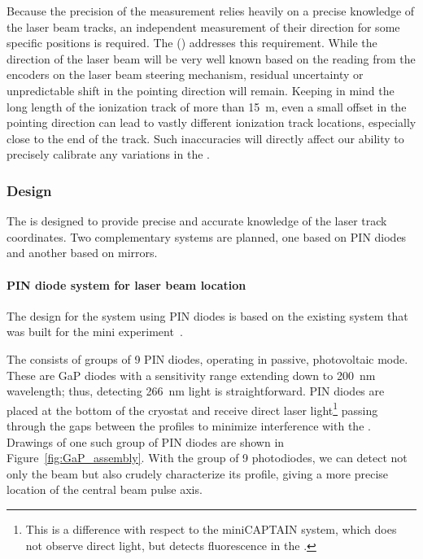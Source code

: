 \label{sec:calib-laser-pos}
Because the precision of the \efield measurement relies heavily on a precise knowledge of the laser beam tracks, an independent measurement of their direction for some specific positions is required. The %
 ()
addresses this requirement. While the direction of the laser beam will be very well known based on the reading from the encoders on the laser beam steering mechanism,  residual uncertainty or unpredictable shift in the pointing direction will remain. 
Keeping in mind the long length of the ionization track of more than \SI{15}{\m}, even a small offset in the pointing direction can lead to vastly different ionization track locations, especially close to the end of the track. Such inaccuracies will directly affect our ability to precisely calibrate any variations in the \efield.

\subsubsection{Design}
The  is designed to provide precise and accurate knowledge of the laser track coordinates.  
Two complementary systems are planned, one based on PIN diodes and another based on mirrors.

\paragraph{PIN diode system for laser beam location}

The design for the system using PIN diodes is based on the existing system that was built for the mini experiment~\cite{Berns:2013usa}.


The  consists of groups of \num{9} PIN diodes, operating in passive, photovoltaic mode. These are GaP diodes with a sensitivity range extending down to  \SI{200}{\nano\m} wavelength; thus, detecting \SI{266}{\nano\m} light is straightforward. %
PIN diodes are placed at the bottom of the cryostat and receive direct laser light\footnote{This is a difference with respect to the miniCAPTAIN system, which does not observe direct light, but detects fluorescence in the \frfour.} passing through the gaps between the  profiles to minimize interference with the . Drawings of one such group of PIN diodes are shown in Figure~\ref{fig:GaP_assembly}. With the group of \num{9} photodiodes, we can detect not only the beam but also crudely characterize its profile, giving a more precise location of the central beam pulse axis. 


